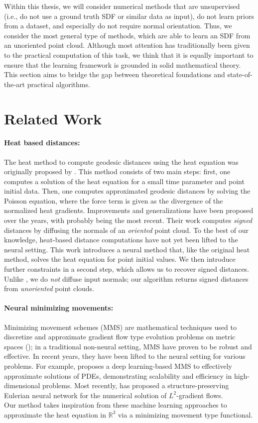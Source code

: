 \documentclass[12pt,openany]{book}
\newcommand{\R}{\mathbb{R}}
\theoremstyle{plainnormal}
\theoremstyle{remark}
\begin{document}
Within this thesis, we will consider numerical methods that are unsupervised (i.e., do not use a ground truth SDF or similar data as input), do not learn priors from a dataset, and especially do not require normal orientation. Thus, we consider the most general type of methods, which are able to learn an SDF from an unoriented point cloud. Although most attention has traditionally been given to the practical computation of this task, we think that it is equally important to ensure that the learning framework is grounded in solid mathematical theory. \\
This section aims to bridge the gap between theoretical foundations and state-of-the-art practical algorithms.

\section{Related Work} \label{SDF_rel_work}
\paragraph{Heat based distances:}
The heat method to compute geodesic distances using the heat equation was originally proposed by \cite{Crane_2013, Crane:2017:HMD}. This method consists of two main steps: first, one computes a solution of the heat equation for a small time parameter and point initial data. Then, one computes approximated geodesic distances by solving the Poisson equation, where the force term is given as the divergence of the normalized heat gradients. Improvements and generalizations have been proposed over the years, with \cite{FengCrane} probably being the most recent. Their work computes \emph{signed} distances by diffusing the normals of an \emph{oriented} point cloud. To the best of our knowledge, heat-based distance computations have not yet been lifted to the neural setting. This work introduces a neural method that, like the original heat method, solves the heat equation for point initial values. We then introduce further constraints in a second step, which allows us to recover signed distances. Unlike \cite{FengCrane}, we do \emph{not} diffuse input normals; our algorithm returns signed distances from \emph{unoriented} point clouds.
\paragraph{Neural minimizing movements:}
Minimizing movement schemes (MMS) are mathematical techniques used to discretize and approximate gradient flow type evolution problems on metric spaces (\cite{de1993new}); in a traditional non-neural setting, MMS have proven to be robust and effective. In recent years, they have been lifted to the neural setting for various problems. For example, \cite{park2023deep} proposes a deep learning-based MMS to effectively approximate solutions of PDEs, demonstrating scalability and efficiency in high-dimensional problems. Most recently, \cite{hu2024energetic} has proposed a structure-preserving Eulerian neural network for the numerical solution of $L^2$-gradient flows.\\
Our method takes inspiration from these machine learning approaches to approximate the heat equation in $\R^3$ via a minimizing movement type functional.
\end{document}
